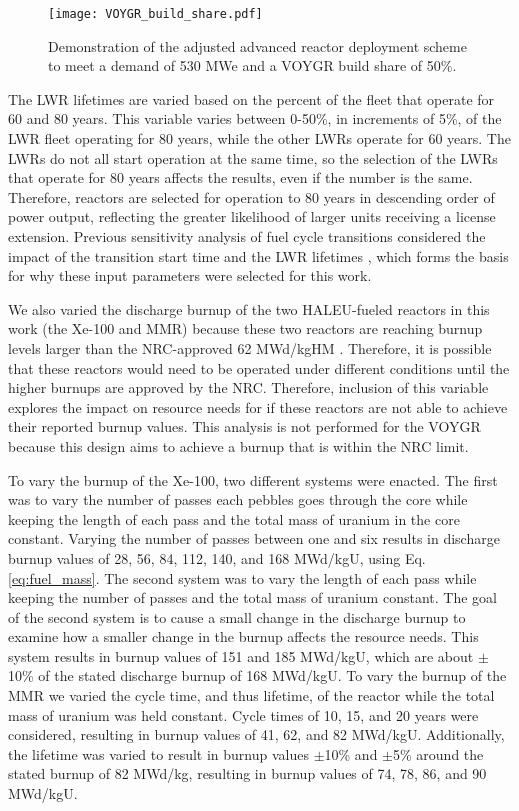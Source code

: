 \begin{figure}
    \centering 
    \texttt{[image: VOYGR\_build\_share.pdf]}
    \caption{Demonstration of the adjusted advanced reactor deployment 
    scheme to meet a demand of 530 MWe and a VOYGR build share of 
    50\%.}
    \label{fig:build-share-deploy}
\end{figure}

The \gls{LWR} lifetimes are varied based 
on the percent of the fleet that operate for 60 and 80 years. This 
variable varies between 0-50\%, in increments of 5\%, of the \gls{LWR} 
fleet operating for 80 
years, while the other \glspl{LWR} operate for 60 years. The 
\glspl{LWR} do not all start operation at the same time, so the 
selection of the \glspl{LWR} that operate for 80 years affects the results, 
even if the number is the same. Therefore, reactors are selected for 
operation to 80 years in 
descending order of power output, reflecting the greater likelihood of 
larger units receiving a license extension. Previous sensitivity analysis of 
fuel cycle transitions considered the impact of the transition start time 
and the \gls{LWR} lifetimes \cite{chee_sensitivity_2019,feng_sensitivity_2020},
which forms the basis for why these input parameters were selected for this 
work.

We also varied the discharge burnup of the two \gls{HALEU}-fueled 
reactors in this work (the Xe-100 and \gls{MMR}) because these two reactors 
are reaching burnup levels larger than the \gls{NRC}-approved 62 MWd/kgHM 
\cite{noauthor_higher_2023}. Therefore, it is possible that these 
reactors would need to be operated under different conditions until the 
higher burnups are approved by the \gls{NRC}.
Therefore, inclusion of this variable explores the impact 
on resource needs for if these reactors are not able to achieve their 
reported burnup values. This analysis is not performed for the VOYGR because this 
design aims to achieve a burnup that is within the \gls{NRC} limit. 

To vary the burnup of the Xe-100, two different systems were enacted. The 
first was to vary the number of passes each pebbles goes through the core
while keeping the length of each pass and the total mass of uranium 
in the core constant. Varying the number of passes between one and six 
results in discharge burnup values of 28, 56, 84, 112, 140, and 168 MWd/kgU, 
using Eq. \ref{eq:fuel_mass}. The second system was to vary the length 
of each pass while keeping the number of passes and the total mass of uranium 
constant. The goal of the second system is to cause a small change in the 
discharge burnup to examine how a smaller change in the burnup affects 
the resource needs. This system results in burnup values of 151 and 185 MWd/kgU, 
which are about $\pm$10\% of the stated discharge burnup of 168 MWd/kgU. 
To vary the burnup of the \gls{MMR} we varied the cycle time, and thus lifetime, of 
the reactor while the total mass of uranium was held constant. 
Cycle times of 10, 15, and 20 years were considered, resulting in burnup 
values of 41, 62, and 82 MWd/kgU. Additionally, the lifetime was varied to 
result in burnup values $\pm$10\% and $\pm$5\% around the stated burnup of 
82 MWd/kg, resulting in burnup values of 74, 78, 86, and 90 MWd/kgU. 

